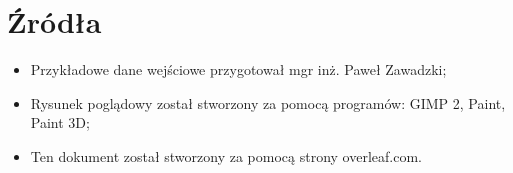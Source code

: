 \documentclass{article}
\begin{document}
\section{Źródła}
{\fontsize{12}{12}\selectfont
\begin{itemize}
    \item Przykładowe dane wejściowe przygotował mgr inż. Paweł Zawadzki;
    \item Rysunek poglądowy został stworzony za pomocą programów: GIMP 2, Paint, Paint 3D;
    \item Ten dokument został stworzony za pomocą strony overleaf.com.
\end{itemize}
}    
\end{document}
